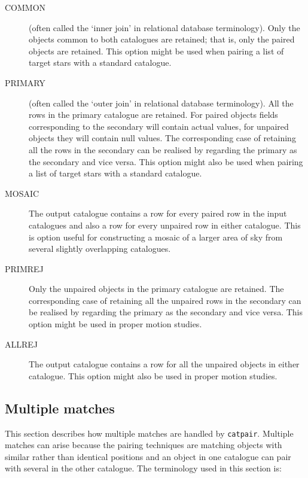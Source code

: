 \documentclass[twoside,11pt]{starlink}
\begin{document}
\begin{description}

  \item[COMMON] (often called the `inner join' in relational database
   terminology). Only the objects common to both catalogues are retained;
   that is, only the paired objects are retained. This option might be
   used when pairing a list of target stars with a standard catalogue.

  \item[PRIMARY] (often called the `outer join' in relational database
   terminology). All the rows in the primary catalogue are retained.
   For paired objects fields corresponding to the secondary will contain
   actual values, for unpaired objects they will contain null values.
   The corresponding case of retaining all the rows in the secondary
   can be realised by regarding the primary as the secondary and vice
   versa. This option might also be used when pairing a list of target
   stars with a standard catalogue.

  \item[MOSAIC] The output catalogue contains a row for every paired row
   in the input catalogues and also a row for every unpaired row in
   either catalogue. This is option useful for constructing a mosaic of a
   larger area of sky from several slightly overlapping catalogues.

  \item[PRIMREJ] Only the unpaired objects in the primary catalogue are
   retained.    The corresponding case of retaining all the unpaired rows in
   the secondary can be realised by regarding the primary as the secondary
   and vice versa. This option might be used in proper motion studies.

  \item[ALLREJ] The output catalogue contains a row for all the unpaired
   objects in either catalogue. This option might also be used in proper
   motion studies.

\end{description}


\subsection{\label{PAIR_MULTIPLE}Multiple matches}

This section describes how multiple matches are handled by \texttt{catpair}. Multiple matches can arise because the pairing techniques are
matching objects with similar rather than identical positions and
an object in one catalogue can pair with several in the other catalogue.
The terminology used in this section is:
\end{document}
